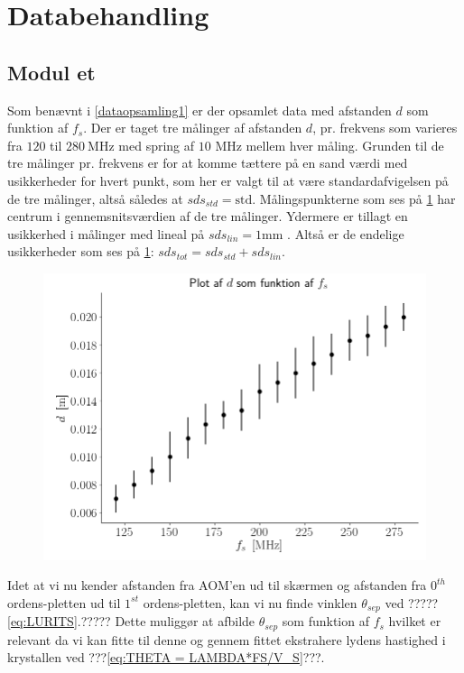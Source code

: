 \documentclass[main]{subfiles}
\begin{document}
\section{Databehandling}
\subsection{Modul et}
Som benævnt i \cref{dataopsamling1} er der opsamlet data med afstanden $d$ som funktion af $f_s$. Der er taget tre målinger af afstanden $d$, pr. frekvens som varieres fra $120$ til $280 \ \si{\mega\hertz}$ med spring af $10$ $\si{\mega\hertz}$ mellem hver måling. Grunden til de tre målinger pr. frekvens er for at komme tættere på en sand værdi med usikkerheder for hvert punkt, som her er valgt til at være standardafvigelsen på de tre målinger, altså således at $sds_{std} = \text{std}$. Målingspunkterne som ses på \cref{fig:rawdata_modul1} har centrum i gennemsnitsværdien af de tre målinger. Ydermere er tillagt en usikkerhed i målinger med lineal på
$ sds_{lin} = 1 \si{\milli\meter} $ . Altså er de endelige usikkerheder som ses på \cref{fig:rawdata_modul1}:  $ sds_{tot} = sds_{std} + sds_{lin} $.
\begin{figure}[H]
    \centering
    \includegraphics[width=\linewidth]{tegninger/rawdata_modul1.png}
    \caption{}
    \label{fig:rawdata_modul1}
\end{figure}
Idet at vi nu kender afstanden fra AOM'en ud til skærmen og afstanden fra $0^{th}$ ordens-pletten ud til $1^{st}$ ordens-pletten, kan vi nu finde vinklen $\theta_{sep}$ ved ?????\cref{eq:LURITS}.?????%
Dette muliggør at afbilde $\theta_{sep}$ som funktion af $f_s$ hvilket er relevant da vi kan fitte til denne og gennem fittet ekstrahere lydens hastighed i krystallen ved ???\cref{eq:THETA = LAMBDA*FS/V_S}???. %
\end{document}
